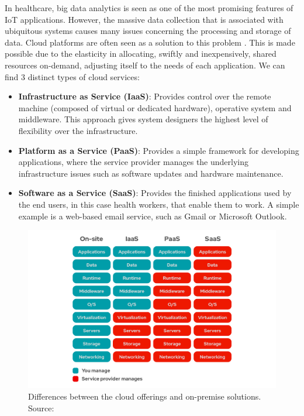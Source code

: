 In healthcare, big data analytics is seen as one of the most promising features of \acs{IoT} applications. However, the massive data collection that is associated with ubiquitous systems causes many issues concerning the processing and storage of data. Cloud platforms are often seen as a solution to this problem \cite{Baker2017}. This is made possible due to the elasticity in allocating, swiftly and inexpensively, shared resources on-demand, adjusting itself to the needs of each application. We can find 3 distinct types of cloud services:

\begin{itemize}
    \item \textbf{Infrastructure as Service (IaaS)}: Provides control over the remote machine (composed of virtual or dedicated hardware), operative system and middleware. This approach gives system designers the highest level of flexibility over the infrastructure.
    \item \textbf{Platform as a Service (PaaS)}: Provides a simple framework for developing applications, where the service provider manages the underlying infrastructure issues such as software updates and hardware maintenance. 
    \item \textbf{Software as a Service (SaaS)}: Provides the finished applications used by the end users, in this case health workers, that enable them to work. A simple example is a web-based email service, such as Gmail or Microsoft Outlook. 
\end{itemize}

\begin{figure}[H]
    \centering
    \includegraphics[width=\linewidth]{images/cloud-services.png}
    \caption[Differences between the cloud offerings and on-premise solutions.]{ Differences between the cloud offerings and on-premise solutions. Source: \cite{RedHat2021}}
\end{figure}

